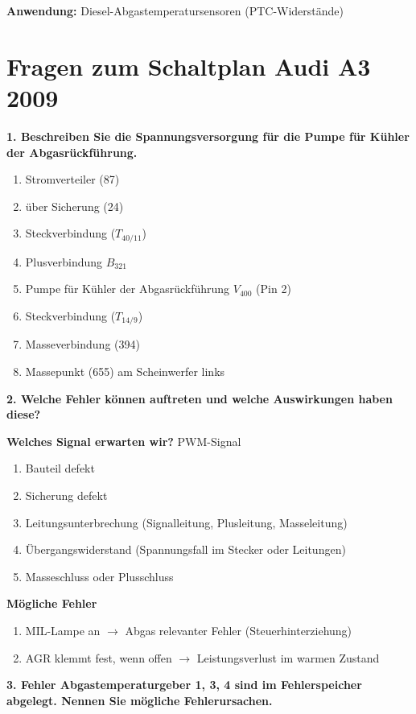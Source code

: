 \textbf{Anwendung:} Diesel-Abgastemperatursensoren (PTC-Widerstände)

\section{Fragen zum Schaltplan Audi A3
2009}\label{fragen-zum-schaltplan-audi-a3-2009}

\textbf{1. Beschreiben Sie die Spannungsversorgung für die Pumpe für
Kühler der Abgasrückführung.}

\begin{enumerate}
\item
  Stromverteiler (87)
\item
  über Sicherung (24)
\item
  Steckverbindung ($T_{40/11}$)
\item
  Plusverbindung $B_{321}$
\item
  Pumpe für Kühler der Abgasrückführung $V_{400}$ (Pin 2)
\item
  Steckverbindung ($T_{14/9}$)
\item
  Masseverbindung (394)
\item
  Massepunkt (655) am Scheinwerfer links
\end{enumerate}

\textbf{2. Welche Fehler können auftreten und welche Auswirkungen haben
diese?}

\textbf{Welches Signal erwarten wir?} PWM-Signal

\begin{enumerate}
\item
  Bauteil defekt
\item
  Sicherung defekt
\item
  Leitungsunterbrechung (Signalleitung, Plusleitung, Masseleitung)
\item
  Übergangswiderstand (Spannungsfall im Stecker oder Leitungen)
\item
  Masseschluss oder Plusschluss
\end{enumerate}

\textbf{Mögliche Fehler}

\begin{enumerate}
\item
  MIL-Lampe an $\to$ Abgas relevanter Fehler (Steuerhinterziehung)
\item
  AGR klemmt fest, wenn offen $\to$ Leistungsverlust im warmen Zustand
\end{enumerate}

\textbf{3. Fehler Abgastemperaturgeber 1, 3, 4 sind im Fehlerspeicher
abgelegt. Nennen Sie mögliche Fehlerursachen.}

